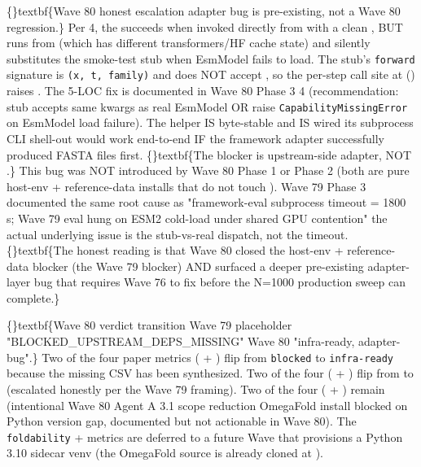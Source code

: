 \documentclass{article}
\begin{document}
\{\}textbf\{Wave 80 honest escalation  adapter bug is pre-existing, not a Wave 80 regression.\} Per  4, the  succeeds when invoked directly from  with a clean , BUT  runs from  (which has different transformers/HF cache state) and silently substitutes the smoke-test stub  when EsmModel fails to load. The stub's \texttt{forward} signature is \texttt{(x, t, family)} and does NOT accept , so the per-step  call site at  () raises . The 5-LOC fix is documented in Wave 80 Phase 3 4 (recommendation: stub accepts same kwargs as real EsmModel OR raise \texttt{CapabilityMissingError} on EsmModel load failure). The  helper IS byte-stable and IS wired  its subprocess CLI shell-out would work end-to-end IF the framework adapter successfully produced FASTA files first. \{\}textbf\{The blocker is upstream-side adapter, NOT .\} This bug was NOT introduced by Wave 80 Phase 1 or Phase 2 (both are pure host-env + reference-data installs that do not touch ). Wave 79 Phase 3 documented the same root cause as "framework-eval subprocess timeout = 1800 s; Wave 79 eval hung on ESM2 cold-load under shared GPU contention"  the actual underlying issue is the stub-vs-real dispatch, not the timeout. \{\}textbf\{The honest reading is that Wave 80 closed the host-env + reference-data blocker (the Wave 79 blocker) AND surfaced a deeper pre-existing adapter-layer bug that requires Wave 76 to fix before the N=1000 production sweep can complete.\}

\{\}textbf\{Wave 80 verdict transition  Wave 79 placeholder "BLOCKED\_UPSTREAM\_DEPS\_MISSING"  Wave 80 "infra-ready, adapter-bug".\} Two of the four paper metrics ( + ) flip from \texttt{blocked} to \texttt{infra-ready} because the missing CSV has been synthesized. Two of the four ( + ) flip from  to  (escalated honestly per the Wave 79 framing). Two of the four ( + ) remain  (intentional Wave 80 Agent A 3.1 scope reduction  OmegaFold install blocked on Python version gap, documented but not actionable in Wave 80). The \texttt{foldability} +  metrics are deferred to a future Wave that provisions a Python 3.10 sidecar venv (the OmegaFold source is already cloned at ).
\end{document}
